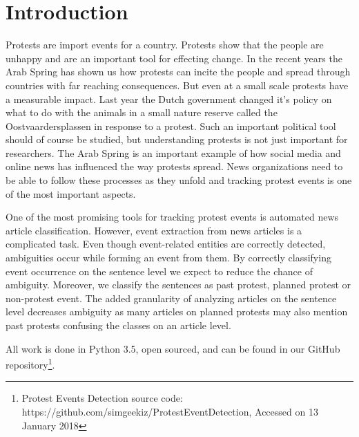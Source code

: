 \documentclass{article}
\begin{document}

 
\section{Introduction}
Protests are import events for a country. Protests show that the people are unhappy and are an important tool for effecting change. In the recent years the Arab Spring has shown us how protests can incite the people and spread through countries with far reaching consequences. But even at a small scale protests have a measurable impact. Last year the Dutch government changed it's policy on what to do with the animals in a small nature reserve called the Oostvaardersplassen in response to a protest. Such an important political tool should of course be studied, but understanding protests is not just important for researchers. The Arab Spring is an important example of how social media and online news has influenced the way protests spread. News organizations need to be able to follow these processes as they unfold and tracking protest events is one of the most important aspects. 

One of the most promising tools for tracking protest events is automated news article classification. However, event extraction from news articles is a complicated task. Even though event-related entities are correctly detected, ambiguities occur while forming an event from them. By correctly classifying event occurrence on the sentence level we expect to reduce the chance of ambiguity. Moreover, we classify the sentences as past protest, planned protest or non-protest event. The added granularity of analyzing articles on the sentence level decreases ambiguity as many articles on planned protests may also mention past protests confusing the classes on an article level.

All work is done in Python 3.5, open sourced, and can be found in our GitHub repository\footnote{Protest Events Detection source code: https://github.com/simgeekiz/ProtestEventDetection, Accessed on 13 January 2018}.
\end{document}
